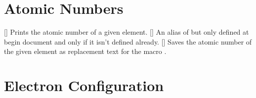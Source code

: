 \documentclass[load-preamble+]{cnltx-doc}
\begin{document}
\begin{example}
   \par
   \par
  \saveelementsymbol{}
  \ttfamily\meaning\foo
\end{example}

\section{Atomic Numbers}

\begin{commands}
  []
    Prints the atomic number of a given element.
  []
    An alias of  but only defined at begin document and only
    if it isn't defined already.
  []
    Saves the atomic number of the given element as replacement text for the
    macro .
\end{commands}

\begin{example}
   \par
   \par
  \saveatomicnumber{}
  \ttfamily\meaning\foo
\end{example}

\section{Electron Configuration}
\end{document}
